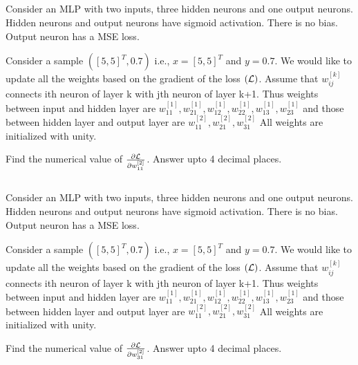 \begin{frame}
\section{}
Consider an MLP with two inputs, three hidden neurons and one output neurons. Hidden neurons and output neurons have sigmoid activation. There is no bias. Output neuron has a MSE loss.

Consider a sample $([5,5]^T,0.7)$ i.e., $x = [5,5]^T$ and $y=0.7$. We would like to update all the weights based on the gradient of the loss $({\cal L})$. Assume that $w_{ij}^{[k]}$ connects ith neuron of layer k with jth neuron of layer k+1. Thus weights between input and hidden layer are $w_{11}^{[1]}, w_{21}^{[1]}, w_{12}^{[1]}, w_{22}^{[1]}, w_{13}^{[1]}, w_{23}^{[1]}$ and those between hidden layer and output layer are $w_{11}^{[2]}, w_{21}^{[2]}, w_{31}^{[2]}$
All weights are initialized with unity.

Find the numerical value of $\frac{\partial \cal L}{\partial w_{11}^{[2]}}$. Answer upto 4 decimal places.


\end{frame}

\begin{frame}
\section{}
Consider an MLP with two inputs, three hidden neurons and one output neurons. Hidden neurons and output neurons have sigmoid activation. There is no bias. Output neuron has a MSE loss.

Consider a sample $([5,5]^T,0.7)$ i.e., $x = [5,5]^T$ and $y=0.7$. We would like to update all the weights based on the gradient of the loss $({\cal L})$. Assume that $w_{ij}^{[k]}$ connects ith neuron of layer k with jth neuron of layer k+1. Thus weights between input and hidden layer are $w_{11}^{[1]}, w_{21}^{[1]}, w_{12}^{[1]}, w_{22}^{[1]}, w_{13}^{[1]}, w_{23}^{[1]}$ and those between hidden layer and output layer are $w_{11}^{[2]}, w_{21}^{[2]}, w_{31}^{[2]}$
All weights are initialized with unity.

Find the numerical value of $\frac{\partial \cal L}{\partial w_{31}^{[2]}}$. Answer upto 4 decimal places.


\end{frame}
